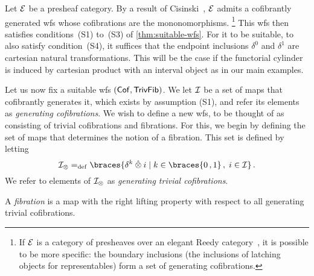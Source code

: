 \documentclass[reqno,10pt,a4paper,oneside,draft]{amsart}
\begin{document}
\begin{example} \label{thm:generation-presheaf-cisinski}
Let $\cal{E}$ be a presheaf category.
By a result of Cisinski~\cite[Proposition~1.2.27]{cisinski-asterisque}, $\cal{E}$ admits a cofibrantly generated wfs whose cofibrations are the mononomorphisms.%
\footnote{If $\cal{E}$ is a category of presheaves over an elegant Reedy category~\cite{bergner-rezk-elegant}, it
is possible to be more specific: the boundary inclusions (\ie the inclusions of latching objects for representables)
form a set of generating cofibrations.}
This wfs then satisfies conditions~(S1) to~(S3) of \cref{thm:suitable-wfs}.
For it to be suitable, \ie to also satisfy condition~(S4), it suffices that the endpoint inclusions $\delta^0$ and $\delta^1$ are cartesian natural transformations.
This will be the case if the functorial cylinder is induced by cartesian product with an interval object as in our main examples.
\end{example}

Let us now fix a suitable wfs $(\Cof,\TrivFib)$. We let $\cal{I}$ be a set of maps that cofibrantly generates it, which exists by assumption (S1), and refer its  elements as \emph{generating cofibrations}. 
We wish to define a new wfs, to be thought of as consisting of trivial cofibrations and fibrations.
For this, we begin by defining the set of maps that determines the notion of a fibration.
This set is defined by letting
\begin{equation} \label{equ:cylinc}
\cal{I}_\otimes \defeq \braces{\kcyl \hatotimes i \mid k \in \braces{0\,, 1} \, , \; i \in \cal{I} }
\, .\end{equation}
We refer to elements of $\cal{I}_\otimes$ as \emph{generating trivial cofibrations}.

\begin{definition} \label{thm:fib}
A \emph{fibration} is a map with the right lifting property with respect to all generating trivial cofibrations.
\end{definition}
 
\end{document}
